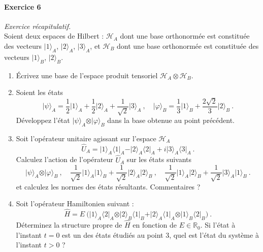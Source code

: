 \paragraph{Exercice 6} \textit{Exercice récapitulatif.} \\
Soient deux espaces de Hilbert : $\mathcal H_A$  dont une base orthonormée est constituée des vecteurs $\vert 1\rangle_A$, $\vert 2\rangle_A$, $\vert 3\rangle_A$, et $\mathcal H_B$ dont une base orthonormée est constituée des vecteurs  $\vert 1\rangle_B$, $\vert 2\rangle_B$.
\begin{enumerate}
\item Écrivez une base de l'espace produit tensoriel $\mathcal H_A \otimes \mathcal H_B$. 
\item Soient les états
\begin{equation}
\vert \psi \rangle_A = \frac{1}{2}\vert 1\rangle_A + 
\frac{1}{2}\vert 2\rangle_A +
\frac{1}{\sqrt{2}}\vert 3\rangle_A \ , \quad
\vert \varphi \rangle_B = \frac{1}{3}\vert 1\rangle_B + 
\frac{2\sqrt{2}}{3}\vert 2\rangle_B \ .
\end{equation}
Développez l'état $\vert \psi \rangle_A\otimes \vert \varphi \rangle_B$ dans la base obtenue au point précédent.
\item Soit l'opérateur unitaire agissant sur l'espace $\mathcal H_A$
\begin{equation}
\hat U_A= \vert 1\rangle_A \langle 1 \vert_A - 
\vert 2\rangle_A \langle 2 \vert_A 
+i
\vert 3\rangle_A \langle 3 \vert_A \ .
\end{equation}
Calculez l'action de l'opérateur $\hat U_A$ sur les états suivants
\begin{equation}
\vert \psi \rangle_A \otimes \vert \varphi \rangle_B\ ,\quad 
\frac{1}{\sqrt{2}} \vert 1\rangle_A
\vert 1\rangle_B + \frac{1}{\sqrt{2}} \vert 2\rangle_A
\vert 2\rangle_B\ ,\quad
\frac{1}{\sqrt{2}} \vert 1\rangle_A
\vert 2\rangle_B + \frac{1}{\sqrt{2}} \vert 3\rangle_A
\vert 1\rangle_B\ .
\end{equation}
et calculez les normes des états résultants. Commentaires ?
\item Soit l'opérateur Hamiltonien suivant :
\begin{equation}
\hat H= E \ \Big( \vert 1\rangle_A \langle 2 \vert_A
\otimes \vert 2\rangle_B \langle 1 \vert_B
 +
  \vert 2\rangle_A \langle 1 \vert_A
\otimes \vert 1\rangle_B \langle 2 \vert_B \Big)
 \ .
\end{equation}
Déterminez la structure propre de $\hat H$ en fonction de $E\in\mathbb R_0$. Si l’état à l’instant $t=0$ est un des états étudiés au point 3, quel est l'état du système à l'instant $t>0$ ?

\end{enumerate}
